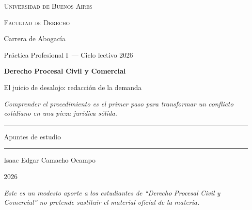 \documentclass[12pt,oneside]{book}
\newcommand{\universidad}{Universidad de Buenos Aires}
\newcommand{\facultad}{Facultad de Derecho}
\newcommand{\carrera}{Carrera de Abogacía}
\newcommand{\materia}{Derecho Procesal Civil y Comercial}
\newcommand{\unidadcurricular}{Práctica Profesional I}
\newcommand{\ciclolectivo}{Ciclo lectivo 2026}
\newcommand{\titulo}{El juicio de desalojo: redacción de la demanda}
\newcommand{\autor}{Isaac Edgar Camacho Ocampo}
\newcommand{\anio}{2026}
\begin{document}
\begin{titlepage}

\thispagestyle{empty}

\begin{center}

\vspace*{1cm}

{\large \textsc{\universidad}}

\vspace{0.2cm}

{\large \textsc{\facultad}}

\vspace{0.2cm}

{\large \carrera}

\vspace{0.3cm}

{\normalsize \unidadcurricular\ --- \ciclolectivo}

\vspace{3cm}

{\Huge \textbf{\materia}}

\vspace{1cm}

{\LARGE \titulo}

\vspace{0.8cm}

\textit{Comprender el procedimiento es el primer paso para transformar un conflicto cotidiano en una pieza jurídica sólida.}

\vspace{1.2cm}

\rule{0.70\textwidth}{0.5pt}

\vspace{0.5cm}

{\large Apuntes de estudio}

\vspace{0.5cm}

\rule{0.70\textwidth}{0.5pt}

\vfill

{\large \autor}

\vspace{0.3cm}

{\large \anio}

\end{center}

\vfill

\begin{flushleft}
\textit{Este es un modesto aporte a los estudiantes de ``Derecho Procesal Civil y Comercial'' no pretende sustituir el material oficial de la materia.}
\end{flushleft}

\end{titlepage}
\end{document}
